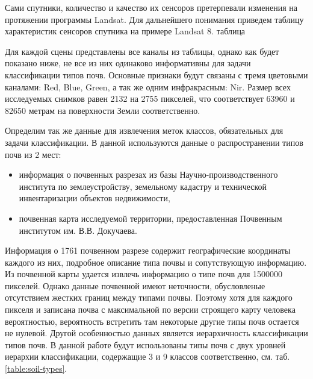 \documentclass[12pt]{article}
\begin{document}
\par
Сами спутники, количество и качество их сенсоров претерпевали изменения на протяжении
программы Landsat. Для дальнейшего понимания приведем таблицу характеристик сенсоров
спутника на примере Landsat 8. {\color{red} таблица}
\par
Для каждой сцены представлены все каналы из таблицы, однако как будет показано ниже, не 
все из них одинаково информативны для задачи классификации типов почв. Основные признаки
будут связаны с тремя цветовыми каналами: Red, Blue, Green, а так же одним инфракрасным: Nir.
Размер всех исследуемых снимков равен 2132 на 2755 пикселей, что соответствует
63960 и 82650 метрам на поверхности Земли соответственно.
\par
Определим так же данные для извлечения меток классов, обязательных для задачи классификации.
В данной используются данные о распространении типов почв из 2 мест:
\begin{itemize}
    \item информация о почвенных разрезах из базы Научно-производственного института по 
        землеустройству, земельному кадастру и технической инвентаризации объектов
        недвижимости,
    \item почвенная карта исследуемой территории, предоставленная Почвенным институтом
        им. В.В. Докучаева.
\end{itemize}
Информация о 1761 почвенном разрезе содержит географические координаты каждого из них,
подробное описание типа почвы и сопутствующую информацию. Из почвенной карты удается
извлечь информацию о типе почв для {\color{red} 1500000} пикселей. Однако данные почвенной
имеют неточности, обусловленые отсутствием жестких границ между типами почвы. Поэтому хотя
для каждого пикселя и записана почва с максимальной по версии строящего карту человека
вероятностью, вероятность встретить там некоторые другие типы почв остается не нулевой.
Другой особенностью данных является иерархичность классификации типов почв.
В данной работе будут использованы типы почв с двух уровней иерархии классификации,
содержащие 3 и 9 классов соответственно, см. таб.\ref{table:soil-types}.
\end{document}
